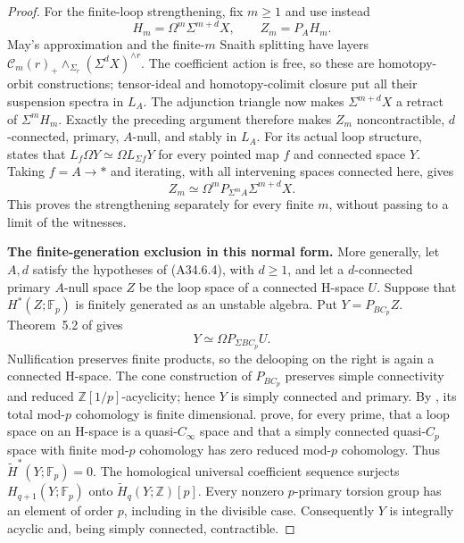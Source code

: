 \begin{proof}
For the finite-loop strengthening, fix $m\geq1$ and use instead
\[
 H_m=\Omega^m\Sigma^{m+d}X,\qquad Z_m=P_AH_m.
 \tag{A34.6.13}
\]
May's approximation and the finite-$m$ Snaith splitting have
layers
$\mathcal C_m(r)_+\wedge_{\Sigma_r}(\Sigma^dX)^{\wedge r}$.
The coefficient action is free, so these are homotopy-orbit
constructions; tensor-ideal and homotopy-colimit closure put
all their suspension spectra in $L_A$.
The adjunction triangle now makes $\Sigma^{m+d}X$ a retract of
$\Sigma^mH_m$.  Exactly the preceding argument therefore makes
$Z_m$ noncontractible, $d$-connected, primary, $A$-null, and
stably in $L_A$.
For its actual loop structure, \citet[Theorem~5.2]{ABousfield1997}
states that $L_f\Omega Y\simeq\Omega L_{\Sigma f}Y$ for every
pointed map $f$ and connected space $Y$.
Taking $f=A\to *$ and iterating, with all intervening spaces
connected here, gives
\[
 Z_m\simeq\Omega^m P_{\Sigma^m A}\Sigma^{m+d}X.
\]
This proves the strengthening separately for every finite $m$,
without passing to a limit of the witnesses.

\par\medskip\noindent\textbf{The finite-generation exclusion in this normal form.}\quad
More generally, let $A,d$ satisfy the hypotheses of
\textup{(A34.6.4)}, with $d\geq1$, and let a $d$-connected primary
$A$-null space $Z$ be the loop space of a connected H-space $U$.
Suppose that $H^*(Z;\mathbb F_p)$ is finitely generated as an
unstable algebra.  Put $Y=P_{BC_p}Z$.  Theorem~5.2 of
\citet{ABousfield1997} gives
\[
             Y\simeq\Omega P_{\Sigma BC_p}U.
\]
Nullification preserves finite products, so the delooping on the
right is again a connected H-space.  The cone construction of
$P_{BC_p}$ preserves simple connectivity and reduced
$\mathbb Z[1/p]$-acyclicity; hence $Y$ is simply connected and
primary.  By \citet[Theorem~7.2]{A4CCSDeconstruct2007}, its total
mod-$p$ cohomology is finite dimensional.
\citet[Theorems~1.1 and~2.2]{A3Hemmi1991} prove, for every prime,
that a loop space on an H-space is a quasi-$C_\infty$ space and
that a simply connected quasi-$C_p$ space with finite mod-$p$
cohomology has zero reduced mod-$p$ cohomology.  Thus
$\widetilde H^*(Y;\mathbb F_p)=0$.
The homological universal coefficient sequence surjects
$H_{q+1}(Y;\mathbb F_p)$ onto
$\widetilde H_q(Y;\mathbb Z)[p]$.
Every nonzero $p$-primary torsion group has an element of order
$p$, including in the divisible case.  Consequently $Y$ is
integrally acyclic and, being simply connected, contractible.


\end{proof}
